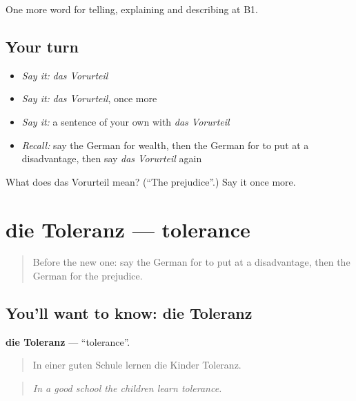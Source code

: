 \begin{grammarlens}[title={What you've built}]
One more word for telling, explaining and describing at B1.
\end{grammarlens}

\subsection*{Your turn}
\begin{itemize}
\raggedright
  \item \emph{Say it:} \emph{das Vorurteil}
  \item \emph{Say it:} \emph{das Vorurteil}, once more
  \item \emph{Say it:} a sentence of your own with \emph{das Vorurteil}
  \item \emph{Recall:} say the German for wealth, then the German for to put at a disadvantage, then say \emph{das Vorurteil} again
\end{itemize}

\begin{tcolorbox}[breakable,colback=teal!4,colframe=teal!35!black,title={Before you move on}]
What does das Vorurteil mean? (\textquotedblleft{}The prejudice\textquotedblright{}.) Say it once more.
\end{tcolorbox}
\section[die Toleranz]{die Toleranz — tolerance}

\label{lesson:GE-C360-toleranz}



\begin{quote}
Before the new one: say the German for to put at a disadvantage, then the German for the prejudice.
\end{quote}

\subsection*{You'll want to know: die Toleranz}
\textbf{die Toleranz} — \textquotedblleft{}tolerance\textquotedblright{}.

\begin{quote}
In einer guten Schule lernen die Kinder Toleranz.
\end{quote}

\begin{quote}
\emph{In a good school the children learn tolerance.}
\end{quote}

